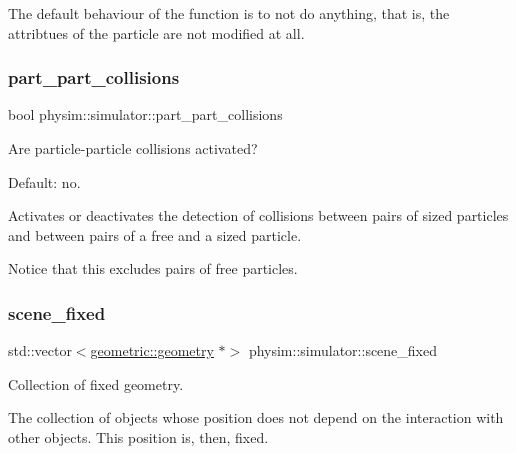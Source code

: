 The default behaviour of the function is to not do anything, that is, the attribtues of the particle are not modified at all. \mbox{\label{classphysim_1_1simulator_a4a7d02feac1ca57bb143b70ad8b81134}} 
\subsubsection{\texorpdfstring{part\+\_\+part\+\_\+collisions}{part\_part\_collisions}}
{\footnotesize\ttfamily bool physim\+::simulator\+::part\+\_\+part\+\_\+collisions\hspace{0.3cm}{\ttfamily [private]}}



Are particle-\/particle collisions activated? 

Default\+: no.

Activates or deactivates the detection of collisions between pairs of sized particles and between pairs of a free and a sized particle.

Notice that this excludes pairs of free particles. \mbox{\label{classphysim_1_1simulator_a7ea652d4a55986d0c2cf527e40495fd8}} 
\subsubsection{\texorpdfstring{scene\+\_\+fixed}{scene\_fixed}}
{\footnotesize\ttfamily std\+::vector$<$\hyperlink{classphysim_1_1geometric_1_1geometry}{geometric\+::geometry} $\ast$$>$ physim\+::simulator\+::scene\+\_\+fixed\hspace{0.3cm}{\ttfamily [private]}}



Collection of fixed geometry. 

The collection of objects whose position does not depend on the interaction with other objects. This position is, then, fixed. \mbox{\label{classphysim_1_1simulator_a61d4f20480309e95fce1db56b7fc8a88}} 
